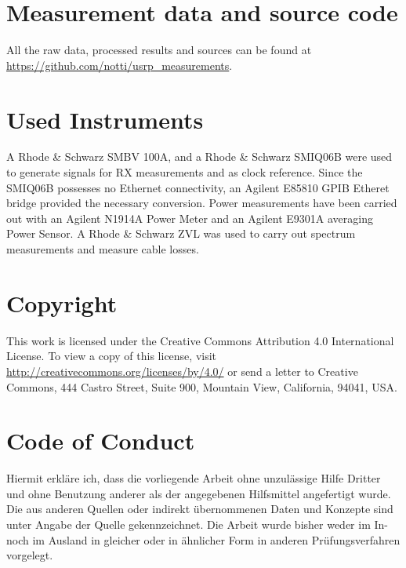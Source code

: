 \documentclass[12pt,a4paper,parskip=full,abstracton]{scrartcl}
\begin{document}
\clearpage
\begin{appendix}
\section{Measurement data and source code}
\label{sec:sources}
All the raw data, processed results and sources can be found at
\url{https://github.com/notti/usrp_measurements}.
\section{Used Instruments}
\label{sec:meters}
A Rhode \& Schwarz SMBV 100A, and a Rhode \& Schwarz SMIQ06B were used to generate
signals for RX measurements and as clock reference. Since the SMIQ06B possesses no
Ethernet connectivity, an Agilent E85810 GPIB Etheret bridge provided the necessary
conversion. Power measurements have been carried out with an Agilent N1914A Power Meter and an
Agilent E9301A averaging Power Sensor. A Rhode \& Schwarz ZVL was used to carry out
spectrum measurements and measure cable losses.

\printglossary[type=\acronymtype]

\listoffigures




\section*{Copyright}
This work is licensed under the Creative Commons Attribution 4.0 International
License. To view a copy of this license, visit
\url{http://creativecommons.org/licenses/by/4.0/} or send a letter to Creative
Commons, 444 Castro Street, Suite 900, Mountain View, California, 94041, USA.

\clearpage
\section*{Code of Conduct}
Hiermit erkl\"are ich, dass die vorliegende Arbeit ohne unzul\"assige Hilfe Dritter und ohne Benutzung
anderer als der angegebenen Hilfsmittel angefertigt wurde. Die aus anderen Quellen oder indirekt
\"ubernommenen Daten und Konzepte sind unter Angabe der Quelle gekennzeichnet.
Die Arbeit wurde bisher weder im In- noch im Ausland in gleicher oder in \"ahnlicher Form in anderen
Pr\"ufungsverfahren vorgelegt.

\par\noindent\makebox[7cm]{\hrulefill}      \hfill\makebox[5cm]{\hrulefill}%
\par\noindent{} \hfill{}%

\end{appendix}
\end{document}
